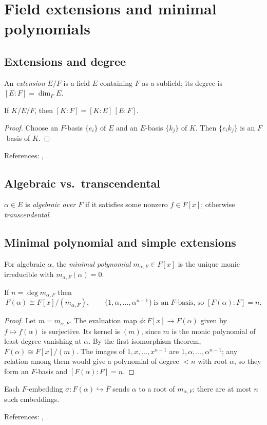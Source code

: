 \section{Field extensions and minimal polynomials}\label{sec:extensions-minimal}

\subsection{Extensions and degree}
\begin{definition}
An \emph{extension} $E/F$ is a field $E$ containing $F$ as a subfield; its degree is $[E\!:\!F]=\dim_F E$.
\end{definition}
\begin{theorem}\label{thm:tower}
If $K/E/F$, then $[K\!:\!F]=[K\!:\!E]\,[E\!:\!F]$.
\end{theorem}
\begin{proof}
Choose an $F$-basis $\{e_i\}$ of $E$ and an $E$-basis $\{k_j\}$ of $K$. Then $\{e_i k_j\}$ is an $F$-basis of $K$.
\end{proof}
References: \cite[\S13]{DF}, \cite[Ch.~V]{Artin}.

\subsection{Algebraic vs.\ transcendental}
\begin{definition}
$\alpha\in E$ is \emph{algebraic over $F$} if it satisfies some nonzero $f\in F[x]$; otherwise \emph{transcendental}.
\end{definition}

\subsection{Minimal polynomial and simple extensions}
\begin{definition}
For algebraic $\alpha$, the \emph{minimal polynomial} $m_{\alpha,F}\in F[x]$ is the unique monic irreducible with $m_{\alpha,F}(\alpha)=0$.
\end{definition}
\begin{proposition}[Structure]\label{prop:simple}
If $n=\deg m_{\alpha,F}$ then
\[
F(\alpha)\cong F[x]/(m_{\alpha,F}),\qquad
\{1,\alpha,\dots,\alpha^{n-1}\}\ \text{is an $F$-basis, so } [F(\alpha)\!:\!F]=n.
\]
\end{proposition}
\begin{proof}
Let $m=m_{\alpha,F}$. The evaluation map $\phi:F[x]\to F(\alpha)$ given by $f\mapsto f(\alpha)$ is surjective. Its kernel is $(m)$, since $m$ is the monic polynomial of least degree vanishing at $\alpha$. By the first isomorphism theorem, $F(\alpha)\cong F[x]/(m)$. The images of $1,x,\ldots,x^{n-1}$ are $1,\alpha,\ldots,\alpha^{n-1}$; any relation among them would give a polynomial of degree $<n$ with root $\alpha$, so they form an $F$-basis and $[F(\alpha)\!:\!F]=n$.
\end{proof}
\begin{remark}[Conjugates]
Each $F$-embedding $\sigma:F(\alpha)\hookrightarrow \overline{F}$ sends $\alpha$ to a root of $m_{\alpha,F}$; there are at most $n$ such embeddings.
\end{remark}
References: \cite[\S13--14]{DF}, \cite[Ch.~V]{Artin}.

